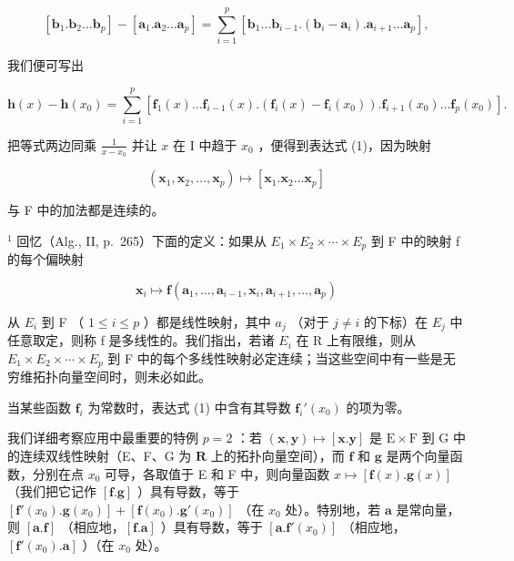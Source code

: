 \[
\left[ \mathbf {b} _ {1}. \mathbf {b} _ {2} \dots \mathbf {b} _ {p} \right] - \left[ \mathbf {a} _ {1}. \mathbf {a} _ {2} \dots \mathbf {a} _ {p} \right] = \sum_ {i = 1} ^ {p} \left[ \mathbf {b} _ {1} \dots \mathbf {b} _ {i - 1}. (\mathbf {b} _ {i} - \mathbf {a} _ {i}). \mathbf {a} _ {i + 1} \dots \mathbf {a} _ {p} \right],
\]

我们便可写出

\[
\mathbf {h} (x) - \mathbf {h} (x _ {0}) = \sum_ {i = 1} ^ {p} \left[ \mathbf {f} _ {1} (x) \dots \mathbf {f} _ {i - 1} (x). (\mathbf {f} _ {i} (x) - \mathbf {f} _ {i} (x _ {0})). \mathbf {f} _ {i + 1} (x _ {0}) \dots \mathbf {f} _ {p} (x _ {0}) \right].
\]

把等式两边同乘 \(\frac{1}{x - x_0}\) 并让 \(x\) 在 I 中趋于 \(x_0\) ，便得到表达式 (1)，因为映射

\[
(\mathbf {x} _ {1}, \mathbf {x} _ {2}, \dots , \mathbf {x} _ {p}) \mapsto [ \mathbf {x} _ {1}. \mathbf {x} _ {2} \dots \mathbf {x} _ {p} ]
\]

与 F 中的加法都是连续的。

\(^{1}\) 回忆（Alg., II, p.~265）下面的定义：如果从 \(E_{1} \times E_{2} \times \cdots \times E_{p}\) 到 F 中的映射 f 的每个偏映射

\[
\mathbf {x} _ {i} \mapsto \mathbf {f} (\mathbf {a} _ {1}, \dots , \mathbf {a} _ {i - 1}, \mathbf {x} _ {i}, \mathbf {a} _ {i + 1}, \dots , \mathbf {a} _ {p})
\]

从 \(E_{i}\) 到 F （ \(1 \leqslant i \leqslant p\) ）都是线性映射，其中 \(a_{j}\) （对于 \(j \neq i\) 的下标）在 \(E_{j}\) 中任意取定，则称 f 是多线性的。我们指出，若诸 \(E_{i}\) 在 R 上有限维，则从 \(E_{1} \times E_{2} \times \cdots \times E_{p}\) 到 F 中的每个多线性映射必定连续；当这些空间中有一些是无穷维拓扑向量空间时，则未必如此。

当某些函数 \(\mathbf{f}_i\) 为常数时，表达式 (1) 中含有其导数 \(\mathbf{f}_i'(x_0)\) 的项为零。

我们详细考察应用中最重要的特例 \(p = 2\) ：若 \((\mathbf{x}, \mathbf{y}) \mapsto [\mathbf{x}.\mathbf{y}]\) 是 \(\mathrm{E} \times \mathrm{F}\) 到 \(\mathrm{G}\) 中的连续双线性映射（E、F、G 为 \(\mathbf{R}\) 上的拓扑向量空间），而 \(\mathbf{f}\) 和 \(\mathbf{g}\) 是两个向量函数，分别在点 \(x_0\) 可导，各取值于 E 和 F 中，则向量函数 \(x \mapsto [\mathbf{f}(x).\mathbf{g}(x)]\) （我们把它记作 \([\mathbf{f}.\mathbf{g}]\) ）具有导数，等于 \([\mathbf{f}'(x_0).\mathbf{g}(x_0)] + [\mathbf{f}(x_0).\mathbf{g}'(x_0)]\) （在 \(x_0\) 处）。特别地，若 \(\mathbf{a}\) 是常向量，则 \([\mathbf{a}.\mathbf{f}]\) （相应地，\([\mathbf{f}.\mathbf{a}]\) ）具有导数，等于 \([\mathbf{a}.\mathbf{f}'(x_0)]\) （相应地，\([\mathbf{f}'(x_0).\mathbf{a}]\) ）（在 \(x_0\) 处）。

